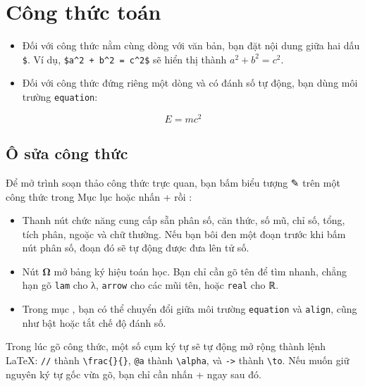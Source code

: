 \section{Công thức toán}
\label{sec:cong-thuc}

\begin{itemize}
  \item Đối với công thức nằm cùng dòng với văn bản, bạn đặt nội dung giữa hai
    dấu \texttt{\$}. Ví dụ, \verb|$a^2 + b^2 = c^2$| sẽ hiển thị thành
    $a^2 + b^2 = c^2$.
  \item Đối với công thức đứng riêng một dòng và có đánh số tự động, bạn dùng
    môi trường \texttt{equation}:
\end{itemize}
\begin{ma}
\begin{equation}
  E = mc^2
  \label{eq:einstein}
\end{equation}
\end{ma}

\subsection{Ô sửa công thức}
Để mở trình soạn thảo công thức trực quan, bạn bấm biểu tượng ✎ trên một công
thức trong Mục lục hoặc nhấn + rồi :


\begin{itemize}
  \item Thanh nút chức năng cung cấp sẵn phân số, căn thức, số mũ, chỉ số, tổng,
    tích phân, ngoặc và chữ thường. Nếu bạn bôi đen một đoạn trước khi bấm nút
    phân số, đoạn đó sẽ tự động được đưa lên tử số.
  \item Nút \textbf{Ω} mở bảng ký hiệu toán học. Bạn chỉ cần gõ tên để tìm
    nhanh, chẳng hạn gõ \texttt{lam} cho λ, \texttt{arrow} cho các mũi tên,
    hoặc \texttt{real} cho ℝ.
  \item Trong mục , bạn có thể chuyển đổi giữa môi trường
    \texttt{equation} và \texttt{align}, cũng như bật hoặc tắt chế độ đánh số.
\end{itemize}

\begin{meo}
Trong lúc gõ công thức, một số cụm ký tự sẽ tự động mở rộng thành lệnh
\LaTeX{}: \texttt{//} thành \verb|\frac{}{}|, \texttt{@a} thành \verb|\alpha|,
và \texttt{->} thành \verb|\to|. Nếu muốn giữ nguyên ký tự gốc vừa gõ, bạn chỉ
cần nhấn + ngay sau đó.
\end{meo}

